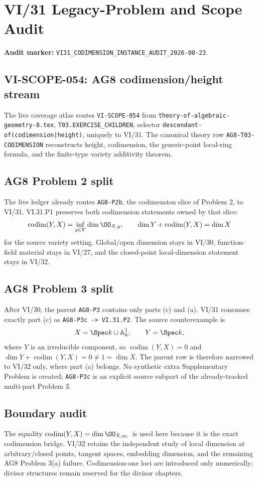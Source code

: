 \chapter*{VI/31 Legacy-Problem and Scope Audit}
\label{audit:vi31}

\textbf{Audit marker:} \texttt{VI31\_CODIMENSION\_INSTANCE\_AUDIT\_2026-08-23}.

\section*{VI-SCOPE-054: AG8 codimension/height stream}
The live coverage atlas routes \texttt{VI-SCOPE-054} from \texttt{theory-of-algebraic-geometry-8.tex},
\texttt{T03.EXERCISE\_CHILDREN}, selector \texttt{descendant-of(codimension|height)}, uniquely to VI/31.
The canonical theory row \texttt{AG8-T03-CODIMENSION} reconstructs height, codimension, the generic-point local-ring
formula, and the finite-type variety additivity theorem.

\section*{AG8 Problem 2 split}
The live ledger already routes \texttt{AG8-P2b}, the codimension slice of Problem 2, to VI/31.  VI.31.P1 preserves
both codimension statements owned by that slice:
\[
\operatorname{codim}(Y,X)=\inf_{y\in Y}\dim\OO_{X,y},
\qquad
\dim Y+\operatorname{codim}(Y,X)=\dim X
\]
for the source variety setting.  Global/open dimension stays in VI/30, function-field material stays in VI/27, and
the closed-point local-dimension statement stays in VI/32.

\section*{AG8 Problem 3 split}
After VI/30, the parent \texttt{AG8-P3} contains only parts (c) and (a).  VI/31 consumes exactly part (c) as
\texttt{AG8-P3c -> VI.31.P2}.  The source counterexample is
\[
X=\Spec k\sqcup\mathbb A^1_k,\qquad Y=\Spec k,
\]
where $Y$ is an irreducible component, so $\operatorname{codim}(Y,X)=0$ and
$\dim Y+\operatorname{codim}(Y,X)=0\neq1=\dim X$.
The parent row is therefore narrowed to VI/32 only, where part (a) belongs.  No synthetic extra Supplementary Problem is
created; \texttt{AG8-P3c} is an explicit source subpart of the already-tracked multi-part Problem 3.

\section*{Boundary audit}
The equality $\operatorname{codim}(Y,X)=\dim\OO_{X,\eta_Y}$ is used here because it is the exact codimension bridge.
VI/32 retains the independent study of local dimension at arbitrary/closed points, tangent spaces, embedding dimension,
and the remaining AG8 Problem 3(a) failure. Codimension-one loci are introduced only numerically; divisor structures
remain reserved for the divisor chapters.
